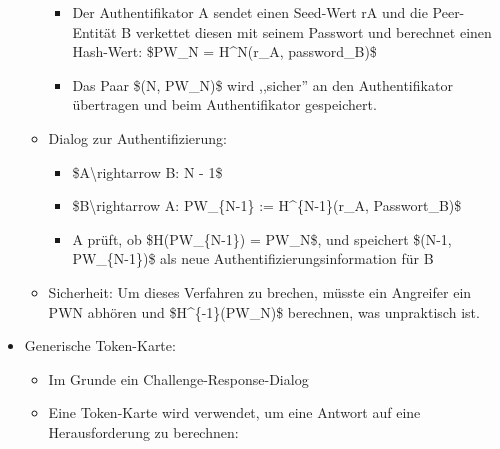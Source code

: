 \documentclass[a4paper]{article}
\begin{document}
\begin{multicols}{3}
\begin{itemize}
\begin{itemize}
                        \begin{itemize}
                            \item
                                  Der Authentifikator A sendet einen Seed-Wert rA und die
                                  Peer-Entität B verkettet diesen mit seinem Passwort und berechnet
                                  einen Hash-Wert: \$PW\_N = H\^{}N(r\_A, password\_B)\$
                            \item
                                  Das Paar \$(N, PW\_N)\$ wird ,,sicher'' an den Authentifikator
                                  übertragen und beim Authentifikator gespeichert.
                        \end{itemize}
                  \item
                        Dialog zur Authentifizierung:

                        \begin{itemize}
                            \item
                                  \$A\textbackslash rightarrow B: N - 1\$
                            \item
                                  \$B\textbackslash rightarrow A: PW\_\{N-1\} := H\^{}\{N-1\}(r\_A,
                                  Passwort\_B)\$
                            \item
                                  A prüft, ob \$H(PW\_\{N-1\}) = PW\_N\$, und speichert \$(N-1,
                                  PW\_\{N-1\})\$ als neue Authentifizierungsinformation für B
                        \end{itemize}
                  \item
                        Sicherheit: Um dieses Verfahren zu brechen, müsste ein Angreifer ein
                        PWN abhören und \$H\^{}\{-1\}(PW\_N)\$ berechnen, was unpraktisch
                        ist.
              \end{itemize}
        \item
              Generische Token-Karte:

              \begin{itemize}
                  \item
                        Im Grunde ein Challenge-Response-Dialog
                  \item
                        Eine Token-Karte wird verwendet, um eine Antwort auf eine
                        Herausforderung zu berechnen:


\end{itemize}
\end{itemize}
\end{multicols}
\end{document}
